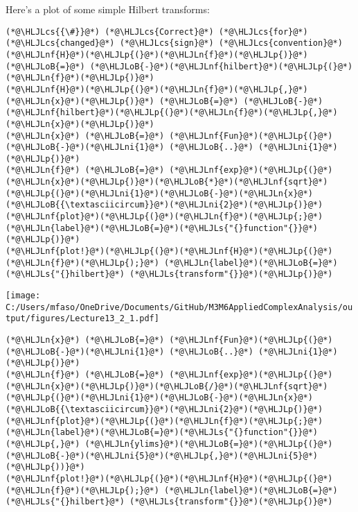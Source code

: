 \documentclass[12pt,a4paper]{article}
\newcommand{\HLJLn}[1]{#1}
\newcommand{\HLJLnf}[1]{\textcolor[RGB]{66,102,213}{#1}}
\newcommand{\HLJLs}[1]{\textcolor[RGB]{201,61,57}{#1}}
\newcommand{\HLJLni}[1]{\textcolor[RGB]{59,151,46}{#1}}
\newcommand{\HLJLoB}[1]{\textcolor[RGB]{102,102,102}{\textbf{#1}}}
\newcommand{\HLJLp}[1]{#1}
\newcommand{\HLJLcs}[1]{\textcolor[RGB]{153,153,119}{\textit{#1}}}
\begin{document}
Here's a plot of some simple Hilbert transforms:


\begin{lstlisting}
(*@\HLJLcs{{\#}}@*) (*@\HLJLcs{Correct}@*) (*@\HLJLcs{for}@*) (*@\HLJLcs{changed}@*) (*@\HLJLcs{sign}@*) (*@\HLJLcs{convention}@*)
(*@\HLJLnf{H}@*)(*@\HLJLp{(}@*)(*@\HLJLn{f}@*)(*@\HLJLp{)}@*) (*@\HLJLoB{=}@*) (*@\HLJLoB{-}@*)(*@\HLJLnf{hilbert}@*)(*@\HLJLp{(}@*)(*@\HLJLn{f}@*)(*@\HLJLp{)}@*)
(*@\HLJLnf{H}@*)(*@\HLJLp{(}@*)(*@\HLJLn{f}@*)(*@\HLJLp{,}@*)(*@\HLJLn{x}@*)(*@\HLJLp{)}@*) (*@\HLJLoB{=}@*) (*@\HLJLoB{-}@*)(*@\HLJLnf{hilbert}@*)(*@\HLJLp{(}@*)(*@\HLJLn{f}@*)(*@\HLJLp{,}@*)(*@\HLJLn{x}@*)(*@\HLJLp{)}@*)
(*@\HLJLn{x}@*) (*@\HLJLoB{=}@*) (*@\HLJLnf{Fun}@*)(*@\HLJLp{(}@*)(*@\HLJLoB{-}@*)(*@\HLJLni{1}@*) (*@\HLJLoB{..}@*) (*@\HLJLni{1}@*)(*@\HLJLp{)}@*)
(*@\HLJLn{f}@*) (*@\HLJLoB{=}@*) (*@\HLJLnf{exp}@*)(*@\HLJLp{(}@*)(*@\HLJLn{x}@*)(*@\HLJLp{)}@*)(*@\HLJLoB{*}@*)(*@\HLJLnf{sqrt}@*)(*@\HLJLp{(}@*)(*@\HLJLni{1}@*)(*@\HLJLoB{-}@*)(*@\HLJLn{x}@*)(*@\HLJLoB{{\textasciicircum}}@*)(*@\HLJLni{2}@*)(*@\HLJLp{)}@*)
(*@\HLJLnf{plot}@*)(*@\HLJLp{(}@*)(*@\HLJLn{f}@*)(*@\HLJLp{;}@*) (*@\HLJLn{label}@*)(*@\HLJLoB{=}@*)(*@\HLJLs{"{}function"{}}@*)(*@\HLJLp{)}@*)
(*@\HLJLnf{plot!}@*)(*@\HLJLp{(}@*)(*@\HLJLnf{H}@*)(*@\HLJLp{(}@*)(*@\HLJLn{f}@*)(*@\HLJLp{);}@*) (*@\HLJLn{label}@*)(*@\HLJLoB{=}@*)(*@\HLJLs{"{}hilbert}@*) (*@\HLJLs{transform"{}}@*)(*@\HLJLp{)}@*)
\end{lstlisting}

\texttt{[image: C:/Users/mfaso/OneDrive/Documents/GitHub/M3M6AppliedComplexAnalysis/output/figures/Lecture13\_2\_1.pdf]}

\begin{lstlisting}
(*@\HLJLn{x}@*) (*@\HLJLoB{=}@*) (*@\HLJLnf{Fun}@*)(*@\HLJLp{(}@*)(*@\HLJLoB{-}@*)(*@\HLJLni{1}@*) (*@\HLJLoB{..}@*) (*@\HLJLni{1}@*)(*@\HLJLp{)}@*)
(*@\HLJLn{f}@*) (*@\HLJLoB{=}@*) (*@\HLJLnf{exp}@*)(*@\HLJLp{(}@*)(*@\HLJLn{x}@*)(*@\HLJLp{)}@*)(*@\HLJLoB{/}@*)(*@\HLJLnf{sqrt}@*)(*@\HLJLp{(}@*)(*@\HLJLni{1}@*)(*@\HLJLoB{-}@*)(*@\HLJLn{x}@*)(*@\HLJLoB{{\textasciicircum}}@*)(*@\HLJLni{2}@*)(*@\HLJLp{)}@*)
(*@\HLJLnf{plot}@*)(*@\HLJLp{(}@*)(*@\HLJLn{f}@*)(*@\HLJLp{;}@*) (*@\HLJLn{label}@*)(*@\HLJLoB{=}@*)(*@\HLJLs{"{}function"{}}@*)(*@\HLJLp{,}@*) (*@\HLJLn{ylims}@*)(*@\HLJLoB{=}@*)(*@\HLJLp{(}@*)(*@\HLJLoB{-}@*)(*@\HLJLni{5}@*)(*@\HLJLp{,}@*)(*@\HLJLni{5}@*)(*@\HLJLp{))}@*)
(*@\HLJLnf{plot!}@*)(*@\HLJLp{(}@*)(*@\HLJLnf{H}@*)(*@\HLJLp{(}@*)(*@\HLJLn{f}@*)(*@\HLJLp{);}@*) (*@\HLJLn{label}@*)(*@\HLJLoB{=}@*)(*@\HLJLs{"{}hilbert}@*) (*@\HLJLs{transform"{}}@*)(*@\HLJLp{)}@*)
\end{lstlisting}
\end{document}
